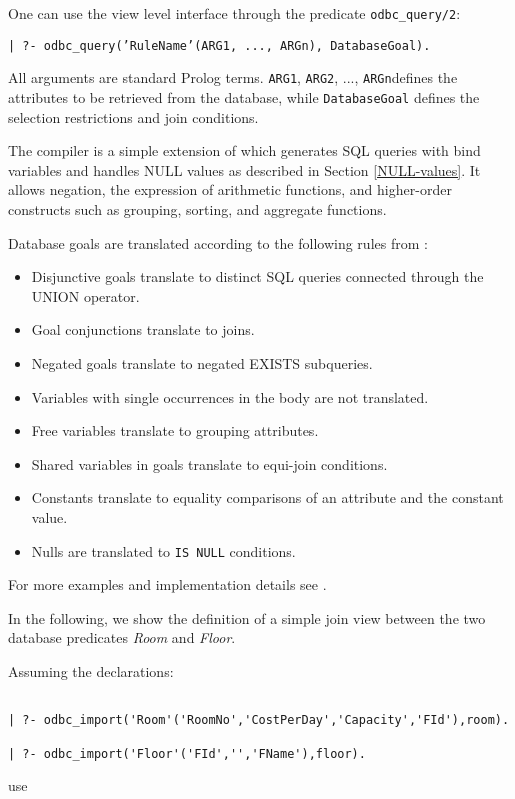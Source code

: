 One can use the view level interface through the predicate {\tt odbc\_query/2}:  
\begin{center}
{\tt | ?- odbc\_query('RuleName'(ARG1, ..., ARGn), DatabaseGoal).}
\end{center}
All arguments are standard Prolog terms.  {\tt ARG1}, {\tt ARG2}, ..., 
{\tt ARGn}defines the attributes to be retrieved from the database, while
{\tt DatabaseGoal} defines the selection restrictions and join conditions.

The compiler is a simple extension of \cite{Dra92} which generates SQL
queries with bind variables and handles NULL values as described in
Section \ref{NULL-values}.  It allows negation, the expression
of arithmetic functions, and higher-order constructs such as grouping,
sorting, and aggregate functions.

Database goals are translated according to the following rules
from \cite{Dra92}:
\begin{itemize}
\item Disjunctive goals translate to distinct SQL queries
	connected through the UNION operator.
\item Goal conjunctions translate to joins.
\item Negated goals translate to negated EXISTS subqueries.
\item Variables with single occurrences in the body are not
	  translated.
\item Free variables translate to grouping attributes.
\item Shared variables in goals translate to equi-join conditions.
\item Constants translate to equality comparisons of an attribute and
	  the constant value.
\item Nulls are translated to {\tt IS NULL} conditions.
\end{itemize}
For more examples and implementation details see \cite{Dra92}.
 
In the following, we show the definition of a simple join view between the 
two database predicates {\it Room} and {\it Floor}.

Assuming the declarations:
\begin{verbatim}

| ?- odbc_import('Room'('RoomNo','CostPerDay','Capacity','FId'),room).

| ?- odbc_import('Floor'('FId','','FName'),floor).
\end{verbatim}

use

